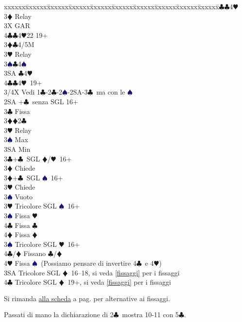\documentclass[a4paper,italian]{article}
\newcommand{\BC}{\textcolor{OliveGreen}{$\clubsuit$}}
\newcommand{\BD}{\textcolor{RedOrange}{$\vardiamondsuit$}}
\newcommand{\BH}{\textcolor{Red2}{$\varheartsuit${}}}
\newcommand{\BS}{\textcolor{MidnightBlue}{$\spadesuit${}}}
\newenvironment{bidtable}
{\begin{tabbing}

    xxxxxx\=xxxxxx\=xxxxxx\=xxxxxx\=xxxxxx\=xxxxxx\=xxxxxx\=xxxxxx\=xxxxxx\=xxxxxx\=\kill}
{\end{tabbing} }%
\begin{document}
\begin{bidtable}
    3\BC {}\BC 4\BH \+\\
    3\BD \> Relay\+\\
    3X \> GAR\\
    4\BC {}\BC 4\BH 22 19+\-\-\\
    3\BD {}\BC 4/5M\+\\
    3\BH \> Relay\+\\
    3\BS {}\BC 4\BS \\
    3\small{SA} \BC 4\BH \\
    4\BC {}\BC 4\BH\ 19+\-\-\\
    3/4X \> Vedi 1\BC -2\BC -2\BS -2\small{SA}-3\BC\ ma con le \BS \-\-\\
    2\small{SA} +\BC\ senza SGL 16+\+\\
    3\BC \> Fissa\\
    3\BD {}\BD 2\BC \\
    3\BH \> Relay\+\\
    3\BS \> Max\\
    3\small{SA} \> Min\-\-\\
    3\BC {}+\BC\ SGL \BD /\BH\ 16+\+\\
    3\BD \> Chiede\-\\
    3\BD {}+\BC\ SGL \BS\ 16+\+\\
    3\BH \> Chiede\+\\
    3\BS \> Vuoto\-\-\\
    3\BH \> Tricolore SGL \BS\ 16+\+\\
    3\BS \> Fissa \BH \\
    4\BC \> Fissa \BC \\
    4\BD \> Fissa \BD \-\\
    3\BS \> Tricolore SGL \BH\ 16+\+\\
    4\BC/\BD \> Fissano \BC /\BD \\
    4\BH \> Fissa \BS\ (Possiamo pensare di invertire 4\BC\ e 4\BH )\-\\
    3\small{SA} \> Tricolore SGL \BD\ 16--18, si veda \ref{fissaggi} per i fissaggi\\
    4\BC \> Tricolore SGL \BD\ 19+, si veda \ref{fissaggi} per i fissaggi\\

\end{bidtable}
\bigbreak
Si rimanda \hyperref[fissaggi]{alla scheda} a pag. \pageref{fissaggi} per alternative ai fissaggi.

Passati di mano la dichiarazione di 2\BC\ mostra 10-11 con 5\BC .
\end{document}
